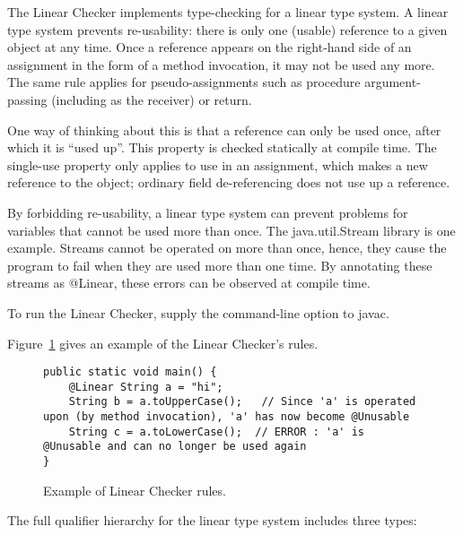 \htmlhr
{}

The Linear Checker implements type-checking for a linear type system.  A
linear type system prevents re-usability:  there is only one (usable) reference
to a given object at any time.  Once a reference appears on the right-hand
side of an assignment in the form of a method invocation, it may not be used any more.  The same rule applies
for pseudo-assignments such as procedure argument-passing (including as the
receiver) or return.

One way of thinking about this is that a reference can only be used once,
after which it is ``used up''.  This property is checked statically at
compile time.  The single-use property only applies to use in an
assignment, which makes a new reference to the object; ordinary field
de-referencing does not use up a reference.

By forbidding re-usability, a linear type system can prevent problems for variables that cannot be used more than once.
The java.util.Stream library is one example. Streams cannot be operated on more than once, hence, they cause the program
to fail when they are used more than one time. By annotating these streams as @Linear, these errors can be observed at
compile time.

To run the Linear Checker, supply the
command-line option to javac.

Figure~\ref{fig-linear-example} gives an example of the Linear Checker's rules.

\begin{figure}
\begin{smaller}
\begin{Verbatim}
public static void main() {
    @Linear String a = "hi";
    String b = a.toUpperCase();   // Since 'a' is operated upon (by method invocation), 'a' has now become @Unusable
    String c = a.toLowerCase();  // ERROR : 'a' is @Unusable and can no longer be used again
}
\end{Verbatim}
\end{smaller}
\caption{Example of Linear Checker rules.}
\label{fig-linear-example}
\end{figure}


The full qualifier hierarchy for the linear type system includes three
types:

